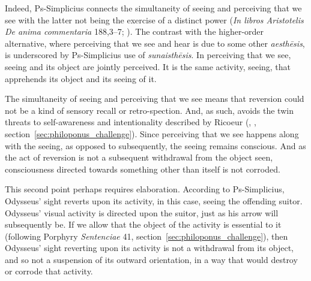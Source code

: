 Indeed, Ps-Simplicius connects the simultaneity of seeing and perceiving that we see with the latter not being the exercise of a distinct power (\emph{In libros Aristotelis De anima commentaria} 188,3–7; \citealt[111]{Lautner:1994cs}). The contrast with the higher-order alternative, where perceiving that we see and hear is due to some other \emph{aesthēsis}, is underscored by Ps-Simplicius use of \emph{sunaisthēsis}. In perceiving that we see, seeing and its object are jointly perceived. It is the same activity, seeing, that apprehends its object and its seeing of it.

The simultaneity of seeing and perceiving that we see means that reversion could not be a kind of sensory recall or retro-spection. And, as such, avoids the twin threats to self-awareness and intentionality described by Ricoeur (\citeyear[59]{Ricoeur:1950cw}, \citeyear[60–1]{Ricoeur:1966hp}, section~\ref{sec:philoponus_challenge}). Since perceiving that we see happens along with the seeing, as opposed to subsequently, the seeing remains conscious. And as the act of reversion is not a subsequent withdrawal from the object seen, consciousness directed towards something other than itself is not corroded.

This second point perhaps requires elaboration. According to Ps-Simplicius, Odysseus' sight reverts upon its activity, in this case, seeing the offending suitor. Odysseus' visual activity is directed upon the suitor, just as his arrow will subsequently be. If we allow that the object of the activity is essential to it (following Porphyry \emph{Sentenciae} 41, section~\ref{sec:philoponus_challenge}), then Odysseus' sight reverting upon its activity is not a withdrawal from its object, and so not a suspension of its outward orientation, in a way that would destroy or corrode that activity.


